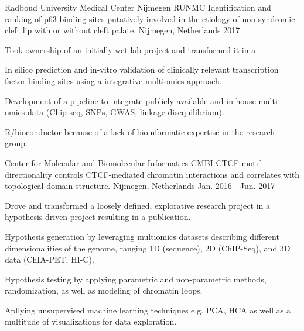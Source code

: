 

\begin{cventries}

  \cventry
    {Radboud University Medical Center Nijmegen RUNMC} %
    {Identification and ranking of p63 binding sites putatively
    involved in the etiology of non-syndromic cleft lip with or
    without cleft palate.} %
    {Nijmegen, Netherlands} %
    {2017} %
    {
      \begin{cvitems} %
        \item {Took ownership of an initially wet-lab project and transformed it in a }
        \item {In silico prediction and in-vitro validation of clinically relevant transcription factor binding sites using a integrative multiomics approach.}
        \item {Development of a pipeline to integrate publicly available and in-house multi-omics data (Chip-seq, SNPs, GWAS, linkage disequilibrium).}
        \item {R/bioconductor because of a lack of bioinformatic expertise in the research group.}
      \end{cvitems}
    }

  \cventry
    {Center for Molecular and Biomolecular Informatics CMBI} %
    {CTCF-motif directionality controls CTCF-mediated chromatin interactions
    and correlates with topological domain structure.} %
    {Nijmegen, Netherlands} %
    {Jan. 2016 - Jun. 2017} %
    {
      \begin{cvitems} %
        \item {Drove and transformed a loosely defined, explorative research project in a hypothesis driven project resulting in a publication.}
        \item {Hypothesis generation by leveraging multiomics datasets describing different dimensionalities of the genome, ranging 1D (sequence), 2D (ChIP-Seq), and 3D data (ChIA-PET, HI-C).}
        \item {Hypothesis testing by applying parametric and non-parametric methods, randomization, as well as modeling of chromatin loops.}
        \item {Apllying unsupervised machine learning techniques e.g. PCA, HCA as well as a multitude of visualizations for data exploration.}
      \end{cvitems}
    }
\end{cventries}
